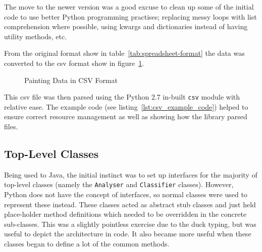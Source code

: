 The move to the newer version was a good excuse to clean up some of the initial code to use better
Python programming practises; replacing messy loops with list comprehension where possible, using
\gls{kwargs} and dictionaries instead of having utility methods, etc.

From the original format show in table~\ref{tab:spreadsheet-format} the data was converted to the 
\gls{csv} format show in figure~\ref{fig:csv-spreadsheet}.

\begin{table}[h]
\caption{Layout of the Painting Data Spreadsheet}\label{tab:spreadsheet-format}
\end{table}

\begin{figure}[h]
\caption{Painting Data in CSV Format}\label{fig:csv-spreadsheet}
\end{figure}

This \gls{csv} file was then parsed using the Python 2.7 in-built \texttt{csv} module with 
relative ease. The example code (see listing~\ref{lst:csv_example_code}) helped to ensure correct
resource management as well as showing how the library parsed files.


\subsection{Top-Level Classes}
Being used to Java, the initial instinct was to set up interfaces for the majority of 
top-level classes (namely the \texttt{Analyser} and \texttt{Classifier} classes). However, 
Python does not have the concept of interfaces, so normal classes were used to represent these
instead. These classes acted as abstract stub classes and just held place-holder method definitions
which needed to be overridden in the concrete sub-classes. This was a slightly pointless exercise 
due to the duck typing, but was useful to depict the architecture in code. It also became more 
useful when these classes began to define a lot of the common methods.

